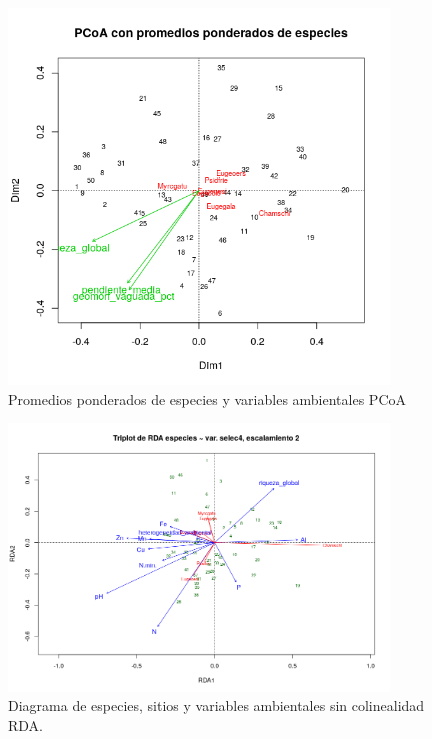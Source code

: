 \documentclass[11pt,]{article}
\begin{document}
\begin{figure}
\centering
\includegraphics[width=0.90000\textwidth]{Pcoa_amb_spec_ escal.png}
\caption{Promedios ponderados de especies y variables ambientales
PCoA\label{fig:ambiental PCoA spec}}
\end{figure}

\begin{figure}
\centering
\includegraphics[width=0.90000\textwidth]{Rplorda_triplot_var.png}
\caption{Diagrama de especies, sitios y variables ambientales sin
colinealidad RDA.\label{fig:varesc2 tripo RDA}}
\end{figure}
\end{document}
